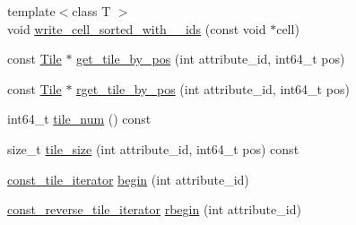 \begin{DoxyCompactItemize}
\item 
{\footnotesize template$<$class T $>$ }\\void \hyperlink{classStorageManager_1_1Fragment_aa5fd646ac3d5a604a2bcdcdf6b1f79c6}{write\+\_\+cell\+\_\+sorted\+\_\+with\+\_\+\_\+ids} (const void $\ast$cell)
\item 
const \hyperlink{classTile}{Tile} $\ast$ \hyperlink{classStorageManager_1_1Fragment_a8a75d16440c30799c494260aaae21986}{get\+\_\+tile\+\_\+by\+\_\+pos} (int attribute\+\_\+id, int64\+\_\+t pos)
\item 
const \hyperlink{classTile}{Tile} $\ast$ \hyperlink{classStorageManager_1_1Fragment_a366b8644d06b35c575847e9e681a42eb}{rget\+\_\+tile\+\_\+by\+\_\+pos} (int attribute\+\_\+id, int64\+\_\+t pos)
\item 
int64\+\_\+t \hyperlink{classStorageManager_1_1Fragment_a77980a66c33881ac0d46ac5747dd759e}{tile\+\_\+num} () const 
\item 
size\+\_\+t \hyperlink{classStorageManager_1_1Fragment_a56a88e321a7bfab562796e5ce239cee1}{tile\+\_\+size} (int attribute\+\_\+id, int64\+\_\+t pos) const 
\item 
\hyperlink{classStorageManager_1_1Fragment_1_1const__tile__iterator}{const\+\_\+tile\+\_\+iterator} \hyperlink{classStorageManager_1_1Fragment_a70af51da34a52acc74c8234f292746f9}{begin} (int attribute\+\_\+id)
\item 
\hyperlink{classStorageManager_1_1Fragment_1_1const__reverse__tile__iterator}{const\+\_\+reverse\+\_\+tile\+\_\+iterator} \hyperlink{classStorageManager_1_1Fragment_ad5a5d0fa8938b7ee9f8ce15dadccfc2a}{rbegin} (int attribute\+\_\+id)
\end{DoxyCompactItemize}
